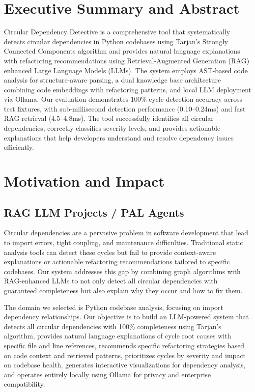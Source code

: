 \documentclass[paper=a4, fontsize=11pt]{scrartcl} %
\author{
    \textbf{Karan Kendre, Ritik Mahyavanshi, Atharva Dhumal, Akshay Prajapati} \\ 
    \href{https://github.com/ritikmahy5/Code-Circular-Dependency-Detection}{PROJECT GIT REPOSITORY}
}%
\begin{document}
\maketitle %

\section{Executive Summary and Abstract}

Circular Dependency Detective is a comprehensive tool that systematically detects circular dependencies in Python codebases using Tarjan's Strongly Connected Components algorithm and provides natural language explanations with refactoring recommendations using Retrieval-Augmented Generation (RAG) enhanced Large Language Models (LLMs). The system employs AST-based code analysis for structure-aware parsing, a dual knowledge base architecture combining code embeddings with refactoring patterns, and local LLM deployment via Ollama. Our evaluation demonstrates 100\% cycle detection accuracy across test fixtures, with sub-millisecond detection performance (0.10--0.24ms) and fast RAG retrieval (4.5--4.8ms). The tool successfully identifies all circular dependencies, correctly classifies severity levels, and provides actionable explanations that help developers understand and resolve dependency issues efficiently.

\section{Motivation and Impact}

\subsection{RAG LLM Projects / PAL Agents}

Circular dependencies are a pervasive problem in software development that lead to import errors, tight coupling, and maintenance difficulties. Traditional static analysis tools can detect these cycles but fail to provide context-aware explanations or actionable refactoring recommendations tailored to specific codebases. Our system addresses this gap by combining graph algorithms with RAG-enhanced LLMs to not only detect all circular dependencies with guaranteed completeness but also explain why they occur and how to fix them.

The domain we selected is Python codebase analysis, focusing on import dependency relationships. Our objective is to build an LLM-powered system that detects all circular dependencies with 100\% completeness using Tarjan's algorithm, provides natural language explanations of cycle root causes with specific file and line references, recommends specific refactoring strategies based on code context and retrieved patterns, prioritizes cycles by severity and impact on codebase health, generates interactive visualizations for dependency analysis, and operates entirely locally using Ollama for privacy and enterprise compatibility.
\end{document}
